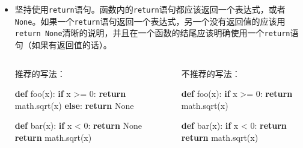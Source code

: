 \documentclass[ignorenonframetext,9pt]{beamer}
\newenvironment{Shaded}{}{}
\newcommand{\ControlFlowTok}[1]{\textcolor[rgb]{0.00,0.44,0.13}{\textbf{#1}}}
\newcommand{\DecValTok}[1]{\textcolor[rgb]{0.25,0.63,0.44}{#1}}
\newcommand{\KeywordTok}[1]{\textcolor[rgb]{0.00,0.44,0.13}{\textbf{#1}}}
\newcommand{\NormalTok}[1]{#1}
\newcommand{\OperatorTok}[1]{\textcolor[rgb]{0.40,0.40,0.40}{#1}}
\newcommand{\VariableTok}[1]{\textcolor[rgb]{0.10,0.09,0.49}{#1}}
\begin{document}
\begin{frame}[fragile]

\begin{itemize}
\item
  坚持使用\texttt{return}语句。函数内的\texttt{return}语句都应该返回一个表达式，或者\texttt{None}。如果一个\texttt{return}语句返回一个表达式，另一个没有返回值的应该用\texttt{return\ None}清晰的说明，并且在一个函数的结尾应该明确使用一个\texttt{return}语句（如果有返回值的话）。
\begin{columns}
\begin{column}[T]{0.5\textwidth}
  推荐的写法：

\begin{Shaded}
\begin{Highlighting}[]
\KeywordTok{def}\NormalTok{ foo(x):}
    \ControlFlowTok{if}\NormalTok{ x }\OperatorTok{>=} \DecValTok{0}\NormalTok{:}
        \ControlFlowTok{return}\NormalTok{ math.sqrt(x)}
    \ControlFlowTok{else}\NormalTok{:}
        \ControlFlowTok{return} \VariableTok{None}

\KeywordTok{def}\NormalTok{ bar(x):}
    \ControlFlowTok{if}\NormalTok{ x }\OperatorTok{<} \DecValTok{0}\NormalTok{:}
        \ControlFlowTok{return} \VariableTok{None}
    \ControlFlowTok{return}\NormalTok{ math.sqrt(x)}
\end{Highlighting}
\end{Shaded}
\end{column}
\begin{column}[T]{0.5\textwidth}
  不推荐的写法：

\begin{Shaded}
\begin{Highlighting}[]
\KeywordTok{def}\NormalTok{ foo(x):}
    \ControlFlowTok{if}\NormalTok{ x }\OperatorTok{>=} \DecValTok{0}\NormalTok{:}
        \ControlFlowTok{return}\NormalTok{ math.sqrt(x)}

\KeywordTok{def}\NormalTok{ bar(x):}
    \ControlFlowTok{if}\NormalTok{ x }\OperatorTok{<} \DecValTok{0}\NormalTok{:}
        \ControlFlowTok{return}
    \ControlFlowTok{return}\NormalTok{ math.sqrt(x)}
\end{Highlighting}
\end{Shaded}
\end{column}
\end{columns}
\end{itemize}

\end{frame}
\end{document}
